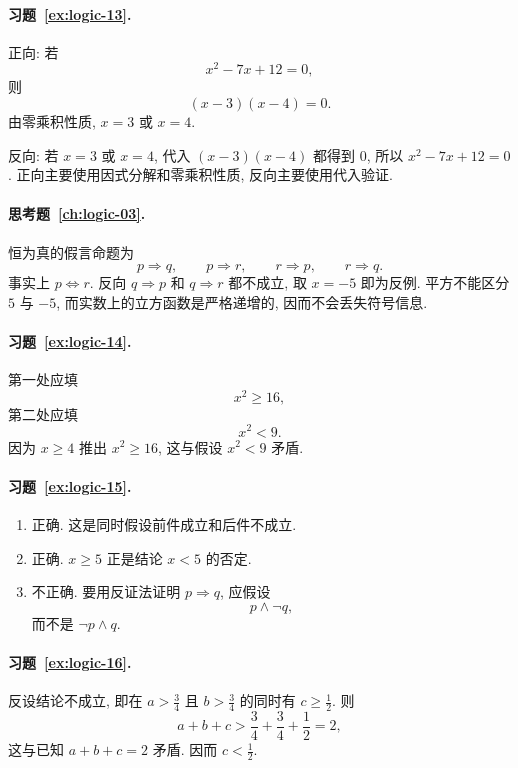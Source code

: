 \documentclass[usesamecnt, thmcnt=section, lang=cn, newtx, 10pt, scheme=chinese]{elegantbook}
\begin{document}
\paragraph*{习题~\ref{ex:logic-13}.}
正向: 若
\[
 x^2-7x+12=0,
\]
则
\[
 (x-3)(x-4)=0.
\]
由零乘积性质, $x=3$ 或 $x=4$.

反向: 若 $x=3$ 或 $x=4$, 代入 $(x-3)(x-4)$ 都得到 $0$, 所以 $x^2-7x+12=0$. 正向主要使用因式分解和零乘积性质, 反向主要使用代入验证.

\paragraph*{思考题~\ref{ch:logic-03}.}
恒为真的假言命题为
\[
 p\Rightarrow q,\qquad p\Rightarrow r,\qquad r\Rightarrow p,\qquad r\Rightarrow q.
\]
事实上 $p\Leftrightarrow r$. 反向 $q\Rightarrow p$ 和 $q\Rightarrow r$ 都不成立, 取 $x=-5$ 即为反例. 平方不能区分 $5$ 与 $-5$, 而实数上的立方函数是严格递增的, 因而不会丢失符号信息.

\paragraph*{习题~\ref{ex:logic-14}.}
第一处应填
\[
 x^2\geq16,
\]
第二处应填
\[
 x^2<9.
\]
因为 $x\geq4$ 推出 $x^2\geq16$, 这与假设 $x^2<9$ 矛盾.

\paragraph*{习题~\ref{ex:logic-15}.}
\begin{enumerate}[label=\rm(\arabic*)]
  \item 正确. 这是同时假设前件成立和后件不成立.
  \item 正确. $x\geq5$ 正是结论 $x<5$ 的否定.
  \item 不正确. 要用反证法证明 $p\Rightarrow q$, 应假设
  \[
    p\wedge\neg q,
  \]
  而不是 $\neg p\wedge q$.
\end{enumerate}

\paragraph*{习题~\ref{ex:logic-16}.}
反设结论不成立, 即在 $a>\frac34$ 且 $b>\frac34$ 的同时有 $c\geq\frac12$. 则
\[
 a+b+c>\frac34+\frac34+\frac12=2,
\]
这与已知 $a+b+c=2$ 矛盾. 因而 $c<\frac12$.
\end{document}
